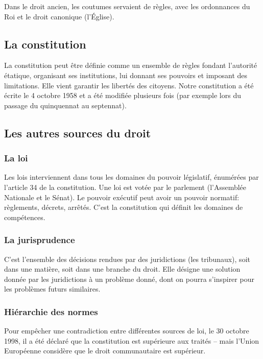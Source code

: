\documentclass[10pt,a4paper]{article}
\begin{document}
Dans le droit ancien, les coutumes servaient de règles, avec les ordonnances du Roi et le droit canonique (l'Église).

\subsection{La constitution}

La constitution peut être définie comme un ensemble de règles fondant l'autorité étatique, organisant ses institutions, lui donnant ses pouvoirs et imposant des limitations. Elle vient garantir les libertés des citoyens. Notre constitution a été écrite le 4 octobre 1958 et a été modifiée plusieurs fois (par exemple lors du passage du quinquennat au septennat).

\subsection{Les autres sources du droit}

\subsubsection{La loi}

Les lois interviennent dans tous les domaines du pouvoir législatif, énumérées par l'article 34 de la constitution. Une loi est votée par le parlement (l'Assemblée Nationale et le Sénat). Le pouvoir exécutif peut avoir un pouvoir normatif: règlements, décrets, arrêtés. C'est la constitution qui définit les domaines de compétences.

\subsubsection{La jurisprudence}

C'est l'ensemble des décisions rendues par des juridictions (les tribunaux), soit dans une matière, soit dans une branche du droit. Elle désigne une solution donnée par les juridictions à un problème donné, dont on pourra s'inspirer pour les problèmes futurs similaires.

\subsubsection{Hiérarchie des normes}

Pour empêcher une contradiction entre différentes sources de loi, le 30 octobre 1998, il a été déclaré que la constitution est supérieure aux traités -- mais l'Union Européenne considère que le droit communautaire est supérieur.
\end{document}
